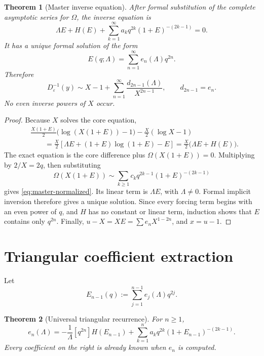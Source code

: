 \documentclass[11pt,a4paper,oneside]{book}
\newtheorem{theorem}{Theorem}[chapter]
\newcommand{\coeff}[2]{\left[#1\right]#2}
\newcommand{\eps}{\varepsilon}
\begin{document}
\begin{theorem}[Master inverse equation]\label{thm:inverse-master}
After formal substitution of the complete asymptotic series for \(\Omega\),
the inverse equation is
\begin{equation}\label{eq:master-normalized}
 \boxed{
 \Lambda E+H(E)
 +\sum_{k=1}^\infty
 a_kq^{2k}(1+E)^{-(2k-1)}=0.}
\end{equation}
It has a unique formal solution of the form
\begin{equation}\label{eq:E-series}
 E(q;\Lambda)=\sum_{n=1}^\infty e_n(\Lambda)q^{2n}.
\end{equation}
Therefore
\begin{equation}\label{eq:inverse-series}
 \boxed{
 D_\eps^{-1}(y)
 \sim X-1+\sum_{n=1}^\infty
 \frac{d_{2n-1}(\Lambda)}{X^{2n-1}},
 \qquad d_{2n-1}=e_n.}
\end{equation}
No even inverse powers of \(X\) occur.
\end{theorem}

\begin{proof}
Because \(X\) solves the core equation,
\begin{align*}
 &\frac{X(1+E)}{2}
 \bigl(\log(X(1+E))-1\bigr)
 -\frac{X}{2}(\log X-1)\\
 &\qquad
 =\frac{X}{2}\left[
   \Lambda E+(1+E)\log(1+E)-E
  \right]
 =\frac{X}{2}\bigl(\Lambda E+H(E)\bigr).
\end{align*}
The exact equation is the core difference plus
\(\Omega(X(1+E))=0\).  Multiplying by \(2/X=2q\), then substituting
\[
 \Omega(X(1+E))
 \sim\sum_{k\ge1}c_kq^{2k-1}(1+E)^{-(2k-1)}
\]
gives \cref{eq:master-normalized}.  Its linear term is \(\Lambda E\),
with \(\Lambda\ne0\).  Formal implicit inversion therefore gives a unique
solution.  Since every forcing term begins with an even power of \(q\), and
\(H\) has no constant or linear term, induction shows that \(E\) contains only
\(q^{2n}\).  Finally, \(u-X=XE=\sum e_nX^{1-2n}\), and \(x=u-1\).
\end{proof}

\section{Triangular coefficient extraction}

Let
\[
 E_{n-1}(q):=\sum_{j=1}^{n-1}e_j(\Lambda)q^{2j}.
\]

\begin{theorem}[Universal triangular recurrence]\label{thm:inverse-recursion}
For \(n\ge1\),
\begin{equation}\label{eq:e-recursion}
 \boxed{
 e_n(\Lambda)=
 -\frac1\Lambda\coeff{q^{2n}}{
  H(E_{n-1})
  +\sum_{k=1}^n
   a_kq^{2k}(1+E_{n-1})^{-(2k-1)}
 }.}
\end{equation}
Every coefficient on the right is already known when \(e_n\) is computed.
\end{theorem}
\end{document}
